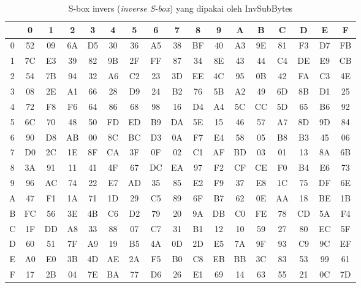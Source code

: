 \begin{table}[htbp]
\centering
\caption{S-box invers (\textit{inverse S-box}) yang dipakai oleh InvSubBytes}
\label{tab:inv-sbox-aes}
\footnotesize
\setlength{\tabcolsep}{3.2pt}
\begin{tabular}{@{}c*{16}{c}@{}}
\hline
      & 0  & 1  & 2  & 3  & 4  & 5  & 6  & 7  & 8  & 9  & A  & B  & C  & D  & E  & F \\
\hline
0 & 52 & 09 & 6A & D5 & 30 & 36 & A5 & 38 & BF & 40 & A3 & 9E & 81 & F3 & D7 & FB \\
1 & 7C & E3 & 39 & 82 & 9B & 2F & FF & 87 & 34 & 8E & 43 & 44 & C4 & DE & E9 & CB \\
2 & 54 & 7B & 94 & 32 & A6 & C2 & 23 & 3D & EE & 4C & 95 & 0B & 42 & FA & C3 & 4E \\
3 & 08 & 2E & A1 & 66 & 28 & D9 & 24 & B2 & 76 & 5B & A2 & 49 & 6D & 8B & D1 & 25 \\
4 & 72 & F8 & F6 & 64 & 86 & 68 & 98 & 16 & D4 & A4 & 5C & CC & 5D & 65 & B6 & 92 \\
5 & 6C & 70 & 48 & 50 & FD & ED & B9 & DA & 5E & 15 & 46 & 57 & A7 & 8D & 9D & 84 \\
6 & 90 & D8 & AB & 00 & 8C & BC & D3 & 0A & F7 & E4 & 58 & 05 & B8 & B3 & 45 & 06 \\
7 & D0 & 2C & 1E & 8F & CA & 3F & 0F & 02 & C1 & AF & BD & 03 & 01 & 13 & 8A & 6B \\
8 & 3A & 91 & 11 & 41 & 4F & 67 & DC & EA & 97 & F2 & CF & CE & F0 & B4 & E6 & 73 \\
9 & 96 & AC & 74 & 22 & E7 & AD & 35 & 85 & E2 & F9 & 37 & E8 & 1C & 75 & DF & 6E \\
A & 47 & F1 & 1A & 71 & 1D & 29 & C5 & 89 & 6F & B7 & 62 & 0E & AA & 18 & BE & 1B \\
B & FC & 56 & 3E & 4B & C6 & D2 & 79 & 20 & 9A & DB & C0 & FE & 78 & CD & 5A & F4 \\
C & 1F & DD & A8 & 33 & 88 & 07 & C7 & 31 & B1 & 12 & 10 & 59 & 27 & 80 & EC & 5F \\
D & 60 & 51 & 7F & A9 & 19 & B5 & 4A & 0D & 2D & E5 & 7A & 9F & 93 & C9 & 9C & EF \\
E & A0 & E0 & 3B & 4D & AE & 2A & F5 & B0 & C8 & EB & BB & 3C & 83 & 53 & 99 & 61 \\
F & 17 & 2B & 04 & 7E & BA & 77 & D6 & 26 & E1 & 69 & 14 & 63 & 55 & 21 & 0C & 7D \\
\hline
\end{tabular}
\end{table}

